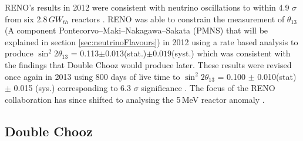 \begin{figure}[!h]
\begin{minipage}{.45\textwidth}
  \label{fig:RENO_Spectrum}
\end{minipage}
\end{figure}

RENO's results in 2012 were consistent with neutrino oscillations to within 4.9 $\sigma$ from six 2.8\,$GW_{th}$ reactors \cite{reno_may_2012}. RENO was able to constrain the measurement of $\theta_{13}$ (A component Pontecorvo–Maki–Nakagawa–Sakata (PMNS) that will be explained in section \ref{sec:neutrinoFlavours}) in 2012 using a rate based analysis to produce  $\sin^2{2\theta_{13}}$ = 0.113$\pm0.013$(stat.)$\pm0.019$(syst.) which was consistent with the findings that Double Chooz would produce later. These results were revised once again in 2013 using 800 days of live time to $\sin^2{2\theta_{13}}$ = 0.100 $\pm$ 0.010(stat) $\pm$ 0.015 (sys.) corresponding to 6.3 $\sigma$ significance \cite{reno2013}. The focus of the RENO collaboration has since shifted to analysing the 5\,MeV reactor anomaly \cite{reno_may_2019}. 

\subsection{Double Chooz} \label{subSec:doubleChooz}

